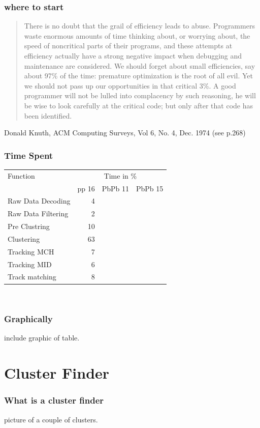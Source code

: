 \documentclass{beamer}
\begin{document}
\begin{frame}
  \frametitle{where to start}
  \begin{quote}
\small{There is no doubt that the grail of efficiency leads to abuse. Programmers waste enormous amounts of time thinking about, or worrying about, the speed of noncritical parts of their programs, and these attempts at efficiency actually have a strong negative impact when debugging and maintenance are considered. We should forget about small efficiencies, say about 97\% of the time: premature optimization is the root of all evil.
Yet we should not pass up our opportunities in that critical 3\%. A good programmer will not be lulled into complacency by such reasoning, he will be wise to look carefully at the critical code; but only after that code has been identified.}  
  \end{quote}
Donald Knuth, ACM Computing Surveys, Vol 6, No. 4, Dec. 1974 (see p.268)
\end{frame}

\begin{frame}
  \frametitle{Time Spent}

\begin{tabular}{|l|r|r|r|}
  Function & \multicolumn{3}{c}{Time in \%} \\  
  & pp 16  & PbPb 11 & PbPb 15\\ \hline 
Raw Data Decoding & 4 & &\\
Raw Data Filtering & 2 & &\\
Pre Clustring & 10 & &\\
Clustering & 63 & & \\
Tracking MCH & 7 & & \\
Tracking MID & 6 & & \\
Track matching & 8 & & \\
\end{tabular}\\
\vspace{2cm}
\end{frame}

\begin{frame}
  \frametitle{Graphically}
  include graphic of table.
\end{frame}
\section{Cluster Finder}

\begin{frame}
\frametitle{What is a cluster finder} 
picture of a couple of clusters.
\end{frame}
\end{document}
